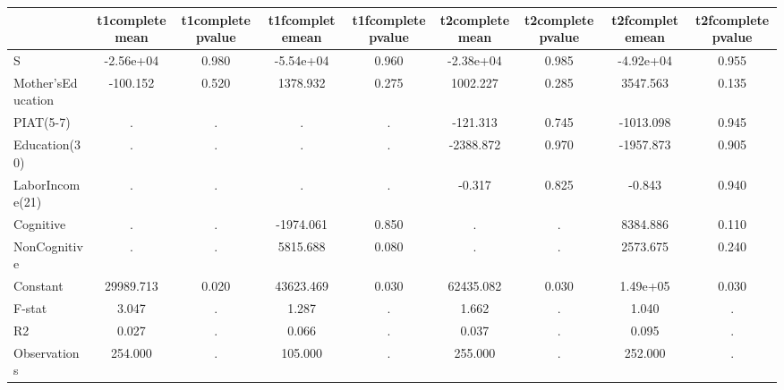\begin{table}[htbp]
\begin{tabular}{lcccccccc} \hline \hline
 & t1completemean  & t1completepvalue  & t1fcompletemean  & t1fcompletepvalue  & t2completemean  & t2completepvalue  & t2fcompletemean  & t2fcompletepvalue  \\  \hline 
S & -2.56e+04 &     0.980 & -5.54e+04 &     0.960 & -2.38e+04 &     0.985 & -4.92e+04 &     0.955 \\  
Mother'sEducation &  -100.152 &     0.520 &  1378.932 &     0.275 &  1002.227 &     0.285 &  3547.563 &     0.135 \\  
PIAT(5-7) &         . &         . &         . &         . &  -121.313 &     0.745 & -1013.098 &     0.945 \\  
Education(30) &         . &         . &         . &         . & -2388.872 &     0.970 & -1957.873 &     0.905 \\  
LaborIncome(21) &         . &         . &         . &         . &    -0.317 &     0.825 &    -0.843 &     0.940 \\  
Cognitive &         . &         . & -1974.061 &     0.850 &         . &         . &  8384.886 &     0.110 \\  
NonCognitive &         . &         . &  5815.688 &     0.080 &         . &         . &  2573.675 &     0.240 \\  
Constant & 29989.713 &     0.020 & 43623.469 &     0.030 & 62435.082 &     0.030 &  1.49e+05 &     0.030 \\  
F-stat &     3.047 &         . &     1.287 &         . &     1.662 &         . &     1.040 &         . \\  
R2 &     0.027 &         . &     0.066 &         . &     0.037 &         . &     0.095 &         . \\  
Observations &   254.000 &         . &   105.000 &         . &   255.000 &         . &   252.000 &         . \\  
\hline \hline \end{tabular}
\end{table}
